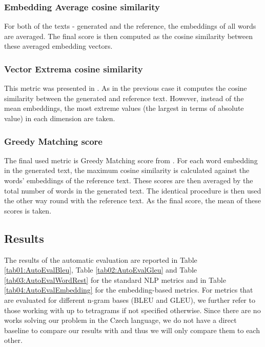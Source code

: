 \subsubsection*{Embedding Average cosine similarity}
For both of the texts - generated and the reference, the embeddings of all words are averaged. The final score is then computed as the cosine similarity between these averaged embedding vectors.

\subsubsection*{Vector Extrema cosine similarity}
This metric was presented in \citet{forgues2014bootstrapping}. As in the previous case it computes the cosine similarity between the generated and reference text. However, instead of the mean embeddings, the most extreme values (the largest in terms of absolute value) in each dimension are taken.

\subsubsection*{Greedy Matching score}
The final used metric is Greedy Matching score from \citet{rus2012optimal}. For each word embedding in the generated text, the maximum cosine similarity is calculated against the words' embeddings of the reference text. These scores are then averaged by the total number of words in the generated text. The identical procedure is then used the other way round with the reference text. As the final score, the mean of these scores is taken.

\subsection{Results}
The results of the automatic evaluation are reported in Table \ref{tab01:AutoEvalBleu}, Table \ref{tab02:AutoEvalGleu} and Table \ref{tab03:AutoEvalWordRest} for the standard NLP metrics and in Table \ref{tab04:AutoEvalEmbedding} for the embedding-based metrics. For metrics that are evaluated for different n-gram bases (BLEU and GLEU), we further refer to those working with up to tetragrams if not specified otherwise. Since there are no works solving our problem in the Czech language, we do not have a direct baseline to compare our results with and thus we will only compare them to each other.\\


